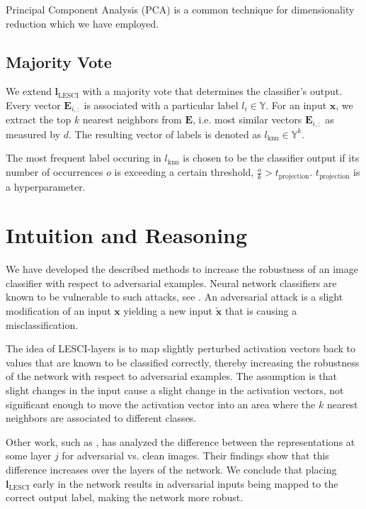 \documentclass{article}
\begin{document}
Principal Component Analysis (PCA) is a common technique for dimensionality reduction which we have employed.

\subsection{Majority Vote}
We extend $\bm{l}_\text{LESCI}$ with a majority vote that determines the classifier's output.
Every vector $\bm{E}_{i,:}$ is associated with a particular label $l_i\in\mathbb{Y}$. For an input $\bm{x}$, we extract the top $k$ nearest neighbors from $\bm{E}$, i.e. most similar vectors $\bm{E}_{i,:}$ as measured by $d$. 
The resulting vector of labels is denoted as $l_\text{knn}\in\mathbb{Y}^k$. 

The most frequent label occuring in $l_\text{knn}$ is chosen to be the classifier output if its number of occurrences $o$ is exceeding a certain threshold, $\frac{o}{k}>t_\text{projection}$.
$t_\text{projection}$ is a hyperparameter.

\section{Intuition and Reasoning}

We have developed the described methods to increase the robustness of an image classifier with respect to adversarial examples.
Neural network classifiers are known to be vulnerable to such attacks, see \cite{goodfellow-adversarial}.
An adversarial attack is a slight modification of an input $\bm{x}$ yielding a new input $\tilde{\bm{x}}$ that is causing a misclassification.

The idea of LESCI-layers is to map slightly perturbed activation vectors back to values that are known to be classified correctly, thereby increasing the robustness of the network with respect to adversarial examples.
The assumption is that slight changes in the input cause a slight change in the activation vectors, not significant enough to move the activation vector into an area where the $k$ nearest neighbors are associated to different classes.

Other work, such as \cite{layerwise-perturbations}, has analyzed the difference between the representations at some layer $j$ for adversarial vs. clean images.
Their findings show that this difference increases over the layers of the network.
We conclude that placing $\bm{l}_\text{LESCI}$ early in the network results in adversarial inputs being mapped to the correct output label, making the network more robust.
\end{document}
